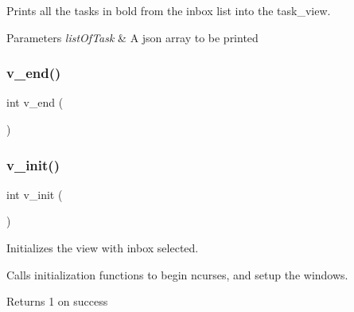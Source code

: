 Prints all the tasks in bold from the inbox list into the task\+\_\+view. 


\begin{DoxyParams}{Parameters}
{\em list\+Of\+Task} & A json array to be printed \\
\hline
\end{DoxyParams}
\mbox{\label{view_8c_a7faf069285110922eedb83e61bcc4742}} 
\subsubsection{v\+\_\+end()}
{\footnotesize\ttfamily int v\+\_\+end (\begin{DoxyParamCaption}{ }\end{DoxyParamCaption})}

\mbox{\label{view_8c_ad54046745cc107dfd25366212d92fa2c}} 
\subsubsection{v\+\_\+init()}
{\footnotesize\ttfamily int v\+\_\+init (\begin{DoxyParamCaption}{ }\end{DoxyParamCaption})}



Initializes the view with inbox selected. 

Calls initialization functions to begin ncurses, and setup the windows.

\begin{DoxyReturn}{Returns}
1 on success 
\end{DoxyReturn}
